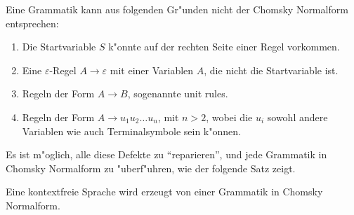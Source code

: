 Eine Grammatik kann aus folgenden Gr"unden nicht der Chomsky Normalform
entsprechen:
\begin{enumerate}
\item Die Startvariable $S$ k"onnte auf der rechten Seite einer
Regel vorkommen.
\item Eine $\varepsilon$-Regel $A\to\varepsilon$ mit einer Variablen
$A$, die nicht die Startvariable ist.
\item Regeln der Form $A\to B$, sogenannte unit rules.
\item Regeln der Form $A\to u_1u_2\dots u_n$, mit $n>2$, wobei
die $u_i$ sowohl andere Variablen wie auch Terminalsymbole sein 
k"onnen.
\end{enumerate}
Es ist m"oglich, alle diese Defekte zu ``reparieren'', und jede
Grammatik in Chomsky Normalform zu "uberf"uhren, wie der folgende Satz
zeigt.

\begin{satz}
Eine kontextfreie Sprache wird erzeugt von einer Grammatik
in Chomsky Normalform.
\end{satz}

